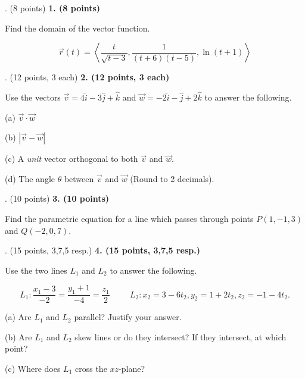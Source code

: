\documentclass[12pt]{article}
\makeatletter
\newenvironment{problem}[1][]{%
  \bigskip%
  \noindent\begin{boxedminipage}{\columnwidth}%
  \def\@tempa{#1}%
  \ifx\@tempa\empty\else%
    \textbf{#1}\hspace{0.5em}%
  \fi%
}{%
  \end{boxedminipage}%
}
\makeatother
\begin{document}
\newpage
\begin{problem}[1. (8 points)]
Find the domain of the vector function. 

\begin{equation*}
    \vec{r}(t) = \left\langle \frac{t}{\sqrt{t-3}}, \frac{1}{(t+6)(t-5)}, \ln(t+1)\right\rangle
\end{equation*}
\end{problem}


\newpage
\begin{problem}[2. (12 points, 3 each)]
Use the vectors $\vec{v} = 4\hat{i}-3\hat{j}+\hat{k}$ and $\vec{w} = -2\hat{i}-\hat{j}+2\hat{k}$ to answer the following.

\vspace{.5cm}

(a) $\Vec{v}\cdot \vec{w}$

\vspace{.125cm}

(b) $|\vec{v}-\vec{w}|$

\vspace{.125cm}

(c) A \emph{unit} vector orthogonal to both $\vec{v}$ and $\vec{w}$.

\vspace{.125cm}

(d) The angle $\theta$ between $\vec{v}$ and $\vec{w}$ (Round to 2 decimals).

\end{problem}



\newpage
\begin{problem}[3. (10 points)]
Find the parametric equation for a line which passes through points $P(1,-1,3)$ and $Q(-2,0,7)$.
\end{problem}


\newpage
\begin{problem}[4. (15 points, 3,7,5 resp.)]
Use the two lines $L_1$ and $L_2$ to answer the following.

\begin{equation*}
    L_1: \frac{x_1-3}{-2}=\frac{y_1+1}{-4}=\frac{z_1}{2} \hspace{1cm} L_2: x_2 = 3-6t_2, y_2 = 1 + 2t_2, z_2 = -1 - 4t_2. 
\end{equation*}

\vspace{.125cm}

(a) Are $L_1$ and $L_2$ parallel? Justify your answer.

\vspace{.125cm}

(b) Are $L_1$ and $L_2$ skew lines or do they intersect? If they intersect, at which point?

\vspace{.125cm}

(c) Where does $L_1$ cross the $xz$-plane?
\end{problem}
\end{document}
